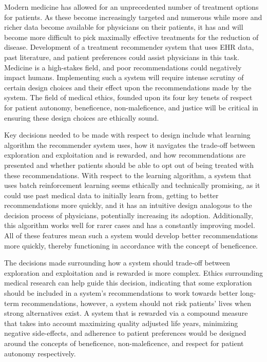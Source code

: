 \documentclass[]{spie}  %
\begin{document}
Modern medicine has allowed for an unprecedented number of treatment options for patients. As these become increasingly targeted and numerous while more and richer data become available for physicians on their patients, it has and will become more difficult to pick maximally effective treatments for the reduction of disease. Development of a treatment recommender system that uses EHR data, past literature, and patient preferences could assist physicians in this task. Medicine is a high-stakes field, and poor recommendations could negatively impact humans. Implementing such a system will require intense scrutiny of certain design choices and their effect upon the recommendations made by the system. The field of medical ethics, founded upon its four key tenets of respect for patient autonomy, beneficence, non-maleficence, and justice will be critical in ensuring these design choices are ethically sound.

Key decisions needed to be made with respect to design include what learning algorithm the recommender system uses, how it navigates the trade-off between exploration and exploitation and is rewarded, and how recommendations are presented and whether patients should be able to opt out of being treated with these recommendations. With respect to the learning algorithm, a system that uses batch reinforcement learning seems ethically and technically promising, as it could use past medical data to initially learn from, getting to better recommendations more quickly, and it has an intuitive design analogous to the decision process of physicians, potentially increasing its adoption. Additionally, this algorithm works well for rarer cases and has a constantly improving model. All of these features mean such a system would develop better recommendations more quickly, thereby functioning in accordance with the concept of beneficence.

The decisions made surrounding how a system should  trade-off between exploration and exploitation and is rewarded is more complex. Ethics surrounding medical research can help guide this decision, indicating that some exploration should be included in a system’s recommendations to work towards better long-term recommendations, however, a system should not risk patients’ lives when strong alternatives exist. A system that is rewarded via a compound measure that takes into account maximizing quality adjusted life years, minimizing negative side-effects, and adherence to patient preferences would be designed around the concepts of beneficence, non-maleficence, and respect for patient autonomy respectively.
\end{document}
